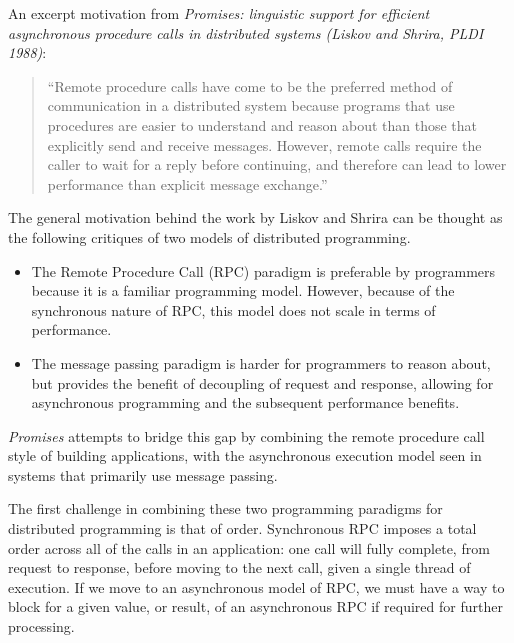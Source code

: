 An excerpt motivation from \textit{Promises: linguistic support for efficient asynchronous procedure calls in distributed systems (Liskov and Shrira, PLDI 1988)}:

\begin{quote}
``Remote procedure calls have come to be the preferred method of communication in a distributed system because programs that use procedures are easier to understand and reason about than those that explicitly send and receive messages. However, remote calls require the caller to wait for a reply before continuing, and therefore can lead to lower performance than explicit message exchange.''
\end{quote}

The general motivation behind the work by Liskov and Shrira can be thought as the following critiques of two models of distributed programming.
\begin{itemize}
	\item The Remote Procedure Call (RPC) paradigm is preferable by programmers because it is a familiar programming model.  However, because of the synchronous nature of RPC, this model does not scale in terms of performance.
	\item The message passing paradigm is harder for programmers to reason about, but provides the benefit of decoupling of request and response, allowing for asynchronous programming and the subsequent performance benefits.
\end{itemize}

\textit{Promises} attempts to bridge this gap by combining the remote procedure call style of building applications, with the asynchronous execution model seen in systems that primarily use message passing.

The first challenge in combining these two programming paradigms for distributed programming is that of order.  Synchronous RPC imposes a total order across all of the calls in an application: one call will fully complete, from request to response, before moving to the next call, given a single thread of execution.  If we move to an asynchronous model of RPC, we must have a way to block for a given value, or result, of an asynchronous RPC if required for further processing.

